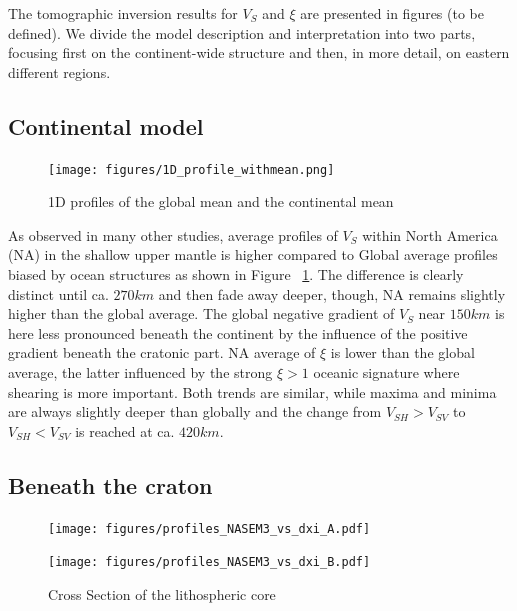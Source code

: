 \documentclass[12pt]{article}
\begin{document}
The tomographic inversion results for $V_S$ and $\xi$ are presented in figures (to be defined). We divide the model description and interpretation into two parts, focusing first on the continent-wide structure and then, in more detail, on eastern different regions.

\subsection{Continental model}
\begin{figure}[ht]
	\centering
	\texttt{[image: figures/1D\_profile\_withmean.png]}

	\caption{1D profiles of the global mean and the continental mean}
	\label{1daverage}
\end{figure}

As observed in many other studies, average profiles of $V_S$ within North America (NA) in the shallow upper mantle is higher compared to Global average profiles biased by ocean structures as shown in Figure ~\ref{1daverage}. 
The difference is clearly distinct until ca. $270km$ and then fade away deeper, though, NA remains slightly higher than the global average. 
The global negative gradient of $V_S$ near $150km$ is here less pronounced beneath the continent by the influence of the positive gradient beneath the cratonic part. 
NA average of $\xi$ is lower than the global average, the latter influenced by the strong $\xi > 1$ oceanic signature where shearing is more important. 
Both trends are similar, while maxima and minima are always slightly deeper than globally and the change from $V_{SH} > V_{SV}$ to $V_{SH} < V_{SV}$ is reached at ca. $420km$.

\subsection{Beneath the craton}

\begin{figure}
	\begin{minipage}{0.5\linewidth}
		\centerline{\texttt{[image: figures/profiles\_NASEM3\_vs\_dxi\_A.pdf]}}
	\end{minipage}
	\hfill
	\begin{minipage}{0.5\linewidth}
		\centerline{\texttt{[image: figures/profiles\_NASEM3\_vs\_dxi\_B.pdf]}}
	\end{minipage}

	\caption{Cross Section of the lithospheric core}
	\label{cratoncross}

\end{figure}
\end{document}
